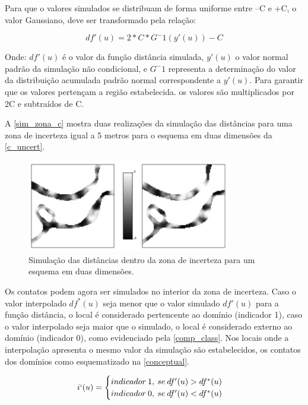 Para que o valores simulados se distribuam de forma uniforme entre –C e +C, o valor Gaussiano, deve ser transformado pela relação:

\begin{equation}
\label{sim_trans}
    df'(u)=2*C*G^-1(y'(u))-C
\end{equation}

Onde: $df'(u)$ é o valor da função distância simulada, $y'(u)$ o valor normal padrão da simulação não condicional, e $G^-1$ representa a determinação do valor da distribuição acumulada padrão normal correspondente a $y'(u)$. Para garantir que os valores pertençam a região estabelecida. os valores são multiplicados por 2C e subtraídos de C.

A \autoref{sim_zona_c} mostra duas realizações da simulação das distâncias para uma zona de incerteza igual a 5 metros para o esquema em duas dimensões da \autoref{c_uncert}.

\begin{figure}[H]
	\caption{\label{sim_zona_c}Simulação das distâncias dentro da zona de incerteza para um esquema em duas dimensões.}
	\centering
		\includegraphics[width=0.8\textwidth]{capitulo_2/imagens/sim_zona_c.png}
\end{figure}

Os contatos podem agora ser simulados no interior da zona de incerteza. Caso o valor interpolado $df^{*}(u)$ seja menor que o valor simulado $df'(u)$ para a função distância, o local é considerado pertencente ao domínio (indicador 1), caso o valor interpolado seja maior que o simulado, o local é considerado externo ao domínio (indicador 0), como evidenciado pela \autoref{comp_class}. Nos locais onde a interpolação apresenta o mesmo valor da simulação são estabelecidos, os contatos dos domínios como esquematizado na \autoref{conceptual}.

\begin{equation}
\label{comp_class}
	i`(u)=\begin{cases}
	indicador \: 1, \: se \: df'(u) > df^{*}(u)\\
	indicador \: 0, \: se \: df'(u) < df^{*}(u)\end{cases}
\end{equation}


